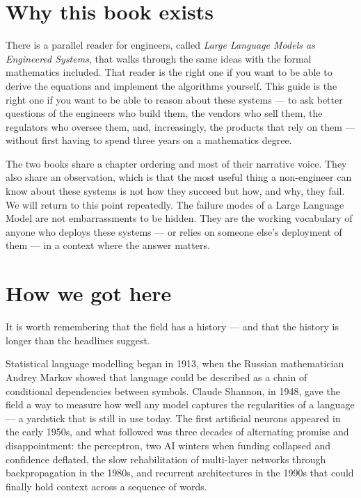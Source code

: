 \section*{Why this book exists}

There is a parallel reader for engineers, called \emph{Large
Language Models as Engineered Systems}, that walks through the
same ideas with the formal mathematics included. That reader is
the right one if you want to be able to derive the equations and
implement the algorithms yourself. This guide is the right one if
you want to be able to reason about these systems --- to ask
better questions of the engineers who build them, the vendors who
sell them, the regulators who oversee them, and, increasingly, the
products that rely on them --- without first having to spend three
years on a mathematics degree.

The two books share a chapter ordering and most of their narrative
voice. They also share an observation, which is that the most
useful thing a non-engineer can know about these systems is not
how they succeed but how, and why, they fail. We will return to
this point repeatedly. The failure modes of a Large Language Model
are not embarrassments to be hidden. They are the working
vocabulary of anyone who deploys these systems --- or relies on
someone else's deployment of them --- in a context where the
answer matters.

\section*{How we got here}

It is worth remembering that the field has a history --- and that
the history is longer than the headlines suggest.

Statistical language modelling began in 1913, when the Russian
mathematician Andrey Markov showed that language could be
described as a chain of conditional dependencies between symbols.
Claude Shannon, in 1948, gave the field a way to measure how well
any model captures the regularities of a language --- a yardstick
that is still in use today. The first artificial neurons appeared
in the early 1950s, and what followed was three decades of
alternating promise and disappointment: the perceptron, two AI
winters when funding collapsed and confidence deflated, the slow
rehabilitation of multi-layer networks through backpropagation in
the 1980s, and recurrent architectures in the 1990s that could
finally hold context across a sequence of words.

